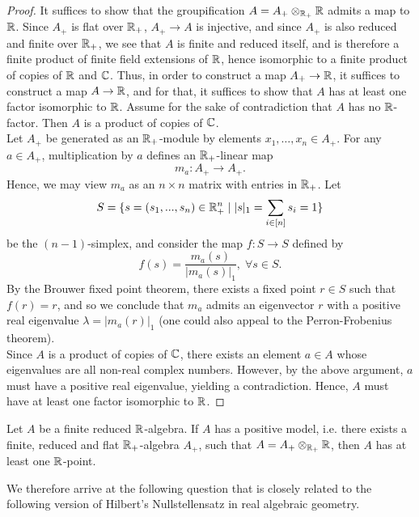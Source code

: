 \begin{proof}
It suffices to show that the groupification $A=A_{+} \otimes_{\mathbb{R}_{+}} \mathbb{R}$ admits a map to $\mathbb{R}$. Since $A_+$ is flat over $\mathbb{R}_{+}$,
$A_+ \to A$ is injective, and since $A_{+}$ is also reduced and finite over $\mathbb{R}_{+}$, we see that $A$ is finite and reduced itself, and is therefore 
a finite product of finite field extensions of $\mathbb{R}$, hence isomorphic to a finite product of copies of $\mathbb{R}$ and $\mathbb{C}$. Thus, in order to construct a map $A_{+} \rightarrow \mathbb{R}$, 
it suffices to construct a map $A \rightarrow \mathbb{R}$, and for that, it suffices to show that $A$ has at least one factor isomorphic to $\mathbb{R}$.
Assume for the sake of contradiction that $A$ has no $\mathbb{R}$-factor. Then $A$ is a product of copies of $\mathbb{C}$.\\
\indent Let $A_+$ be generated as an $\mathbb{R}_{+}$-module by elements $x_1, \ldots, x_n \in A_{+}$. For any $a \in A_+$, multiplication by 
$a$ defines an $\mathbb{R}_{+}$-linear map
\[m_a: A_{+} \to A_{+}.\]
Hence, we may view $m_a$ as an $n \times n$ matrix with entries in $\mathbb{R}_{+}$. Let 
\[S = \{ s = (s_1,...,s_n) \in \mathbb{R}_+^{n} \mid |s|_1 =\sum_{i \in [n]} s_i = 1\}\]
be the $(n-1)$-simplex, and consider the map $f: S \to S$ defined by
\[f(s) = \frac{m_a(s)}{|m_a(s)|_1}, \; \forall s \in S.\]
By the Brouwer fixed point theorem,
there exists a fixed point $r \in S$ such that $f(r) = r$,
and so we conclude that $m_a$ admits an eigenvector $r$ with a positive real eigenvalue $\lambda = |m_a(r)|_1$ 
(one could also appeal to the Perron-Frobenius theorem).\\
\indent Since $A$ is a product of copies of $\mathbb{C}$, there exists an element $a \in A$ whose eigenvalues are all non-real complex numbers.
However, by the above argument, $a$ must have a positive real eigenvalue, yielding a contradiction. Hence, $A$ must have at least one factor isomorphic to $\mathbb{R}$.
\end{proof}
\begin{corollary}
Let $A$ be a finite reduced $\mathbb{R}$-algebra. If $A$ has a positive model, i.e. there exists a finite, reduced and flat $\mathbb{R}_{+}$-algebra $A_{+}$, 
such that $A = A_{+} \otimes_{\mathbb{R}_{+}} \mathbb{R}$, then $A$ has at least one $\mathbb{R}$-point.
\end{corollary}
We therefore arrive at the following question 
that is closely related to the following version of Hilbert's Nullstellensatz in real algebraic geometry.
